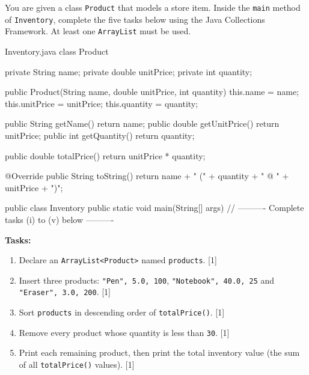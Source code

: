 
\noindent You are given a class \texttt{Product} that models a store item.
Inside the \texttt{main} method of \texttt{Inventory}, complete the five
tasks below using the Java Collections Framework. At least one
\texttt{ArrayList} must be used.

\begin{javafile}{Inventory.java}
class Product {
    private String name;
    private double unitPrice;
    private int quantity;

    public Product(String name, double unitPrice, int quantity) {
        this.name = name;
        this.unitPrice = unitPrice;
        this.quantity = quantity;
    }

    public String getName()      { return name; }
    public double getUnitPrice() { return unitPrice; }
    public int    getQuantity()  { return quantity; }

    public double totalPrice() {
        return unitPrice * quantity;
    }

    @Override
    public String toString() {
        return name + " (" + quantity + " @ " + unitPrice + ")";
    }
}

public class Inventory {
    public static void main(String[] args) {
        // ---------- Complete tasks (i) to (v) below ----------
    }
}
\end{javafile}

\noindent\textbf{Tasks:}
\begin{enumerate}[label=(\roman*), itemsep=2pt, topsep=4pt]
    \item Declare an \texttt{ArrayList<Product>} named \texttt{products}. \hfill [1]
    \item Insert three products: \texttt{"Pen", 5.0, 100},
          \texttt{"Notebook", 40.0, 25} and \texttt{"Eraser", 3.0, 200}. \hfill [1]
    \item Sort \texttt{products} in descending order of \texttt{totalPrice()}. \hfill [1]
    \item Remove every product whose quantity is less than \texttt{30}. \hfill [1]
    \item Print each remaining product, then print the total inventory value
          (the sum of all \texttt{totalPrice()} values). \hfill [1]
\end{enumerate}
